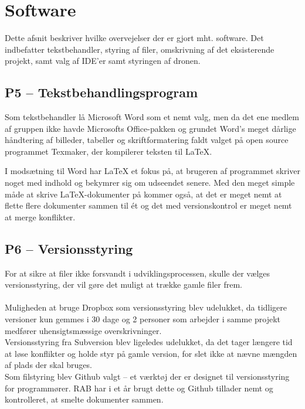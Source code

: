 \documentclass[Main]{subfiles}
\begin{document}
\chapter{Software}
Dette afsnit beskriver hvilke overvejelser der er gjort mht. software.
Det indbefatter tekstbehandler, styring af filer, omskrivning af det eksisterende projekt, samt valg af IDE'er samt styringen af dronen.


\section[Tekstbehandlingsprogram]{P5 -- Tekstbehandlingsprogram}

Som tekstbehandler lå Microsoft Word som et nemt valg, men da det ene medlem af gruppen ikke havde Microsofts Office-pakken og grundet Word's meget dårlige håndtering af billeder, tabeller og skriftformatering faldt valget på open source programmet Texmaker\cite{Texmaker}, der kompilerer teksten til LaTeX.

I modsætning til Word har LaTeX et fokus på, at brugeren af programmet skriver noget med indhold og bekymrer sig om udseendet senere. 
Med den meget simple måde at skrive LaTeX-dokumenter på kommer også, at det er meget nemt at flette flere dokumenter sammen til ét og det med versionskontrol er meget nemt at merge konflikter.



\section[Versionsstyring]{P6 -- Versionsstyring}
For at sikre at filer ikke forsvandt i udviklingsprocessen, skulle der vælges  versionsstyring, der vil gøre det muligt at trække gamle filer frem.
\\
\\
Muligheden at bruge Dropbox som versionsstyring blev udelukket, da tidligere versioner kun gemmes i 30 dage\cite{Dropbox} og 2 personer som arbejder i samme projekt medfører uhensigtsmæssige overskrivninger.
\\
Versionsstyring fra Subversion\cite{Subversion} blev ligeledes udelukket, da det tager længere tid at løse konflikter og holde styr på gamle version, for slet ikke at nævne mængden af plads der skal bruges.
\\
Som filstyring blev Github\cite{Github-IHA} valgt -- et værktøj der er designet til versionsstyring for programmører. 
RAB har i et år brugt dette og Github tillader nemt og kontrolleret, at smelte dokumenter sammen.
\end{document}
